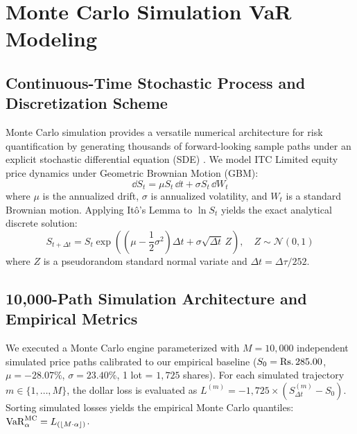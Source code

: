 
\section{Monte Carlo Simulation VaR Modeling}
\label{sec:monte_carlo_var}

\subsection{Continuous-Time Stochastic Process and Discretization Scheme}

Monte Carlo simulation provides a versatile numerical architecture for risk quantification by generating thousands of forward-looking sample paths under an explicit stochastic differential equation (SDE) \citep{duffie1997overview}. We model ITC Limited equity price dynamics under Geometric Brownian Motion (GBM):
\begin{equation}
    \dd S_t = \mu S_t \, \dd t + \sigma S_t \, \dd W_t
    \label{eq:gbm_sde}
\end{equation}
where $\mu$ is the annualized drift, $\sigma$ is annualized volatility, and $W_t$ is a standard Brownian motion. Applying Itô's Lemma to $\ln S_t$ yields the exact analytical discrete solution:
\begin{equation}
    S_{t+\Delta t} = S_t \exp \left( \left( \mu - \frac{1}{2}\sigma^2 \right)\Delta t + \sigma \sqrt{\Delta t} \, Z \right), \quad Z \sim \mathcal{N}(0, 1)
    \label{eq:gbm_exact_step}
\end{equation}
where $Z$ is a pseudorandom standard normal variate and $\Delta t = \Delta \tau / 252$.

\subsection{10,000-Path Simulation Architecture and Empirical Metrics}

We executed a Monte Carlo engine parameterized with $M = 10,000$ independent simulated price paths calibrated to our empirical baseline ($S_0 = \text{\text{Rs.}\,}285.00$, $\mu = -28.07\%$, $\sigma = 23.40\%$, 1 lot = $1,725$ shares). For each simulated trajectory $m \in \{1, \dots, M\}$, the dollar loss is evaluated as $L^{(m)} = -1,725 \times (S_{\Delta t}^{(m)} - S_0)$. Sorting simulated losses yields the empirical Monte Carlo quantiles: $\operatorname{VaR}_{\alpha}^{\text{MC}} = L_{(\lfloor M \cdot \alpha \rfloor)}$.

